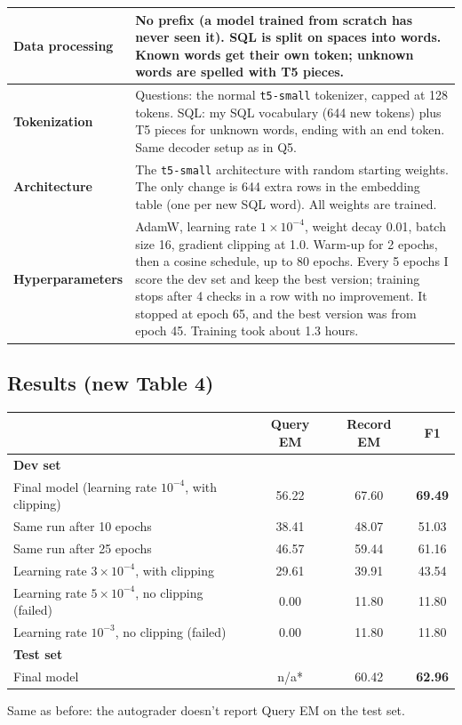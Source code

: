 \documentclass[11pt]{article}
\newcommand{\code}[1]{\texttt{#1}}
\begin{document}
\begin{table}[H]
\centering
\begin{tabular}{|P{3.45cm}|P{11.45cm}|}
\hline
\textbf{Data processing} &
No prefix (a model trained from scratch has never seen it). SQL is split on spaces into words.
Known words get their own token; unknown words are spelled with T5 pieces. \\ \hline
\textbf{Tokenization} &
Questions: the normal \code{t5-small} tokenizer, capped at 128 tokens. SQL: my SQL vocabulary
(644 new tokens) plus T5 pieces for unknown words, ending with an end token. Same decoder setup as
in Q5. \\ \hline
\textbf{Architecture} &
The \code{t5-small} architecture with random starting weights. The only change is 644 extra rows
in the embedding table (one per new SQL word). All weights are trained. \\ \hline
\textbf{Hyperparameters} &
AdamW, learning rate $1\times10^{-4}$, weight decay 0.01, batch size 16, gradient clipping at 1.0.
Warm-up for 2 epochs, then a cosine schedule, up to 80 epochs. Every 5 epochs I score the dev set
and keep the best version; training stops after 4 checks in a row with no improvement. It stopped
at epoch 65, and the best version was from epoch 45. Training took about 1.3 hours. \\ \hline
\end{tabular}
\end{table}

\subsection*{Results (new Table 4)}

\begin{table}[H]
\centering
\begin{tabular}{|l|c|c|c|}
\hline
 & Query EM & Record EM & F1 \\ \hline
\multicolumn{4}{|l|}{\textbf{Dev set}} \\
Final model (learning rate $10^{-4}$, with clipping) & 56.22 & 67.60 & \textbf{69.49} \\
Same run after 10 epochs & 38.41 & 48.07 & 51.03 \\
Same run after 25 epochs & 46.57 & 59.44 & 61.16 \\
Learning rate $3\times10^{-4}$, with clipping & 29.61 & 39.91 & 43.54 \\
Learning rate $5\times10^{-4}$, no clipping (failed) & 0.00 & 11.80 & 11.80 \\
Learning rate $10^{-3}$, no clipping (failed) & 0.00 & 11.80 & 11.80 \\ \hline
\multicolumn{4}{|l|}{\textbf{Test set}} \\
Final model & n/a* & 60.42 & \textbf{62.96} \\ \hline
\end{tabular}
\end{table}
{\small *Same as before: the autograder doesn't report Query EM on the test set.}
\end{document}
